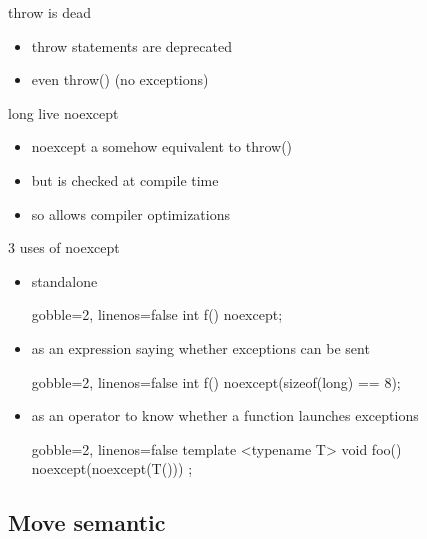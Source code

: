 \begin{frame}[fragile]
  \begin{block}{throw is dead}
    \begin{itemize}
    \item throw statements are deprecated
    \item even throw() (no exceptions)
    \end{itemize}
  \end{block}
  \pause
  \begin{exampleblock}{long live noexcept}
    \begin{itemize}
    \item noexcept a somehow equivalent to throw()
    \item but is checked at compile time
    \item so allows compiler optimizations
    \end{itemize}
  \end{exampleblock}
\end{frame}

\begin{frame}[fragile]
  \begin{block}{3 uses of noexcept}
    \begin{itemize}
    \item standalone
      \begin{cppcode*}{gobble=2, linenos=false}
        int f() noexcept;
      \end{cppcode*}
    \item as an expression saying whether exceptions can be sent
      \begin{cppcode*}{gobble=2, linenos=false}
        int f() noexcept(sizeof(long) == 8);
      \end{cppcode*}
    \item as an operator to know whether a function launches exceptions
      \begin{cppcode*}{gobble=2, linenos=false}
        template <typename T> void foo()
             noexcept(noexcept(T())) {};
      \end{cppcode*}
   \end{itemize}
  \end{block}
\end{frame}

\subsection[mv]{Move semantic}

